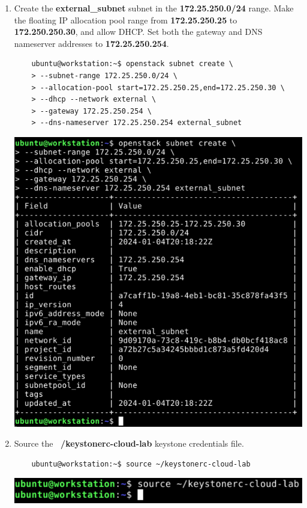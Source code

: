 \documentclass[letterpaper, 12pt]{article}
\begin{document}
\begin{enumerate}
    \item Create the \textbf{external\_subnet} subnet in the \textbf{172.25.250.0/24} range. Make the floating IP
    allocation pool range from \textbf{172.25.250.25} to \textbf{172.250.250.30}, and allow DHCP. Set both the gateway
    and DNS nameserver addresses to \textbf{172.25.250.254}.
    \begin{lstlisting}
    ubuntu@workstation:~$ openstack subnet create \
    > --subnet-range 172.25.250.0/24 \
    > --allocation-pool start=172.25.250.25,end=172.25.250.30 \
    > --dhcp --network external \
    > --gateway 172.25.250.254 \
    > --dns-nameserver 172.25.250.254 external_subnet
    \end{lstlisting}

    \begin{center}
        \includegraphics[width=\linewidth]{images/part1/step19.png}
    \end{center}

    \item Source the \textbf{~/keystonerc-cloud-lab} keystone credentials file.
    \begin{lstlisting}
    ubuntu@workstation:~$ source ~/keystonerc-cloud-lab
    \end{lstlisting}

    \begin{center}
        \includegraphics[width=\linewidth]{images/part1/step20.png}
    \end{center}


\end{enumerate}
\end{document}

